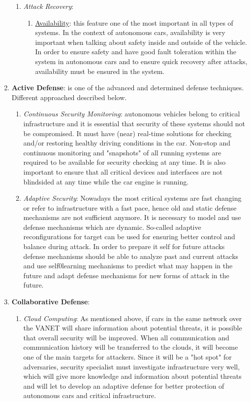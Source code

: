 \begin{enumerate}
\begin{enumerate}
			\item \textit{Attack Recovery}:
			\begin{enumerate}
				\item \underline{Availability}: this feature one of the most important in all types of systems. In the context of autonomous cars, availability is very important when talking about safety inside and outside of the vehicle. In order to ensure safety and have good fault toleration within the system in autonomous cars and to ensure quick recovery after attacks, availability must be ensured in the system.
			\end{enumerate}
		\end{enumerate}				
		\item \textbf{Active Defense}: is one of the advanced and determined defense techniques. Different approached described below.	
		\begin{enumerate}
			\item \textit{Continuous Security Monitoring}: autonomous vehicles belong to critical infrastructure and it is essential that security of these systems should not be compromised. It must have (near) real-time solutions for checking and/or restoring healthy driving conditions in the car. Non-stop and continuous monitoring and "snapshots" of all running systems are required to be available for security checking at any time. It is also important to ensure that all critical devices and interfaces are not blindsided at any time while the car engine is running.			
			\item \textit{Adaptive Security}: Nowadays the most critical systems are fast changing or refer to infrastructure with a fast pace, hence old and static defense mechanisms are not sufficient anymore. It is necessary to model and use defense mechanisms which are dynamic. So-called adaptive reconfigurations for target can be used for ensuring better control and balance during attack. In order to prepare it self for future attacks defense mechanisms should be able to analyze past and current attacks and use self0learning mechanisms to predict what may happen in the future and adapt defense mechanisms for new forms of attack in the future.
		\end{enumerate}				
		\item \textbf{ Collaborative Defense}: 
		\begin{enumerate}
			\item \textit{Cloud Computing}: As mentioned above, if cars in the same network over the \gls{VANET} will share information about potential threats, it is possible that overall security will be improved. When all communication and communication history will be transferred to the clouds, it will become one of the main targets for attackers. Since it will be a "hot spot" for adversaries, security specialist must investigate infrastructure very well, which will give more knowledge and information about potential threats and will let to develop an adaptive defense for better protection of autonomous cars and critical infrastructure.
		\end{enumerate}
	\end{enumerate}

